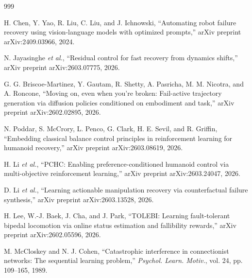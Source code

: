 \documentclass[12pt,a4paper,oneside]{report}
\begin{document}
\begin{thebibliography}{999}

H. Chen, Y. Yao, R. Liu, C. Liu, and J. Ichnowski, ``Automating robot failure recovery using vision-language models with optimized prompts,'' arXiv preprint arXiv:2409.03966, 2024.




N. Jayasinghe \textit{et al.}, ``Residual control for fast recovery from dynamics shifts,'' arXiv preprint arXiv:2603.07775, 2026.




G. G. Briscoe-Martinez, Y. Gautam, R. Shetty, A. Pasricha, M. M. Nicotra, and A. Roncone, ``Moving on, even when you're broken: Fail-active trajectory generation via diffusion policies conditioned on embodiment and task,'' arXiv preprint arXiv:2602.02895, 2026.




N. Poddar, S. McCrory, L. Penco, G. Clark, H. E. Sevil, and R. Griffin, ``Embedding classical balance control principles in reinforcement learning for humanoid recovery,'' arXiv preprint arXiv:2603.08619, 2026.




H. Li \textit{et al.}, ``{PCHC}: Enabling preference-conditioned humanoid control via multi-objective reinforcement learning,'' arXiv preprint arXiv:2603.24047, 2026.




D. Li \textit{et al.}, ``Learning actionable manipulation recovery via counterfactual failure synthesis,'' arXiv preprint arXiv:2603.13528, 2026.




H. Lee, W.-J. Baek, J. Cha, and J. Park, ``{TOLEBI}: Learning fault-tolerant bipedal locomotion via online status estimation and fallibility rewards,'' arXiv preprint arXiv:2602.05596, 2026.




M. McCloskey and N. J. Cohen, ``Catastrophic interference in connectionist networks: The sequential learning problem,'' \textit{Psychol. Learn. Motiv.}, vol. 24, pp. 109--165, 1989.




\end{thebibliography}
\end{document}
